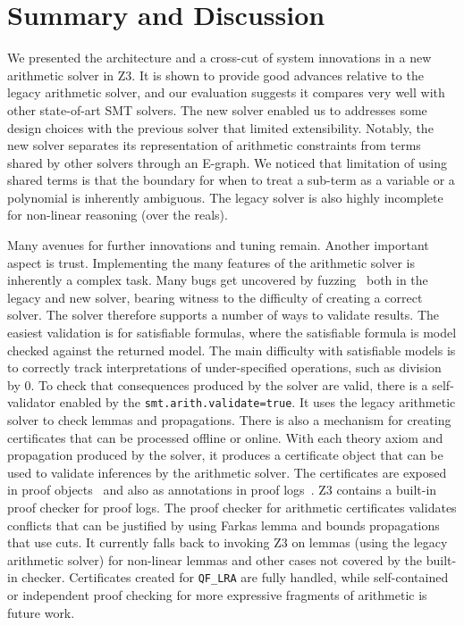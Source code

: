 \section{Summary and Discussion}

We presented the architecture and a cross-cut of system innovations in a new arithmetic solver in Z3.
It is shown to provide good advances relative to the legacy arithmetic solver,
and our evaluation suggests it compares very well with other state-of-art SMT solvers.
The new solver enabled us to addresses some design choices with the previous solver that limited extensibility.
Notably, the new solver separates its representation of arithmetic constraints from terms shared by other solvers through an E-graph.
We noticed that limitation of using shared terms is that the boundary for when to treat a sub-term as a variable or a polynomial is inherently
ambiguous. The legacy solver is also highly incomplete for non-linear
reasoning (over the reals). 

Many avenues for further innovations and tuning remain. Another important aspect is trust.
Implementing the many features of the arithmetic solver is inherently a complex task.
Many bugs get uncovered by fuzzing~\cite{DBLP:conf/sat/BrummayerLB10,DBLP:conf/sigsoft/MansurCWZ20,winterer-zhang-su-oopsla2020,winterer-zhang-su-pldi2020,DBLP:journals/pacmpl/ParkWZS21,DHuang,Maolin23} both in the legacy and new solver, 
bearing witness to the difficulty of creating a correct solver. The solver therefore supports a number of ways to validate results.
The easiest validation is for satisfiable formulas, where the satisfiable formula is model checked against the returned model.
The main difficulty with satisfiable models is to correctly track interpretations of under-specified operations, such as division by 0.
To check that consequences produced by the solver are valid, there is a self-validator 
enabled by the {\tt smt.arith.validate=true}. It uses the legacy arithmetic solver
to check lemmas and propagations. 
There is also a mechanism for creating certificates that can be processed offline or online.
With each theory axiom and propagation produced by the solver, it produces a certificate object that can be used to validate
inferences by the arithmetic solver. The certificates are exposed in proof objects~\cite{MouraB08b} and also as annotations in proof logs~\cite{z3prooflogs}.
Z3 contains a built-in proof checker for proof logs. The proof checker for arithmetic certificates validates
conflicts that can be justified by using Farkas lemma and bounds propagations that use cuts. It currently falls back to invoking
Z3 on lemmas (using the legacy arithmetic solver) for non-linear lemmas and other cases not covered by the built-in checker.
Certificates created for {\tt QF\_LRA} are fully handled, while self-contained or independent proof checking for more expressive fragments
of arithmetic is future work.
